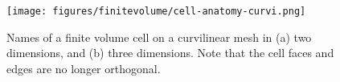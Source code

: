 \begin{figure}[ht]
    \centering
    \texttt{[image: figures/finitevolume/cell-anatomy-curvi.png]}
    \caption{Names of a finite volume cell on a curvilinear mesh in (a) two dimensions, and (b) three dimensions. Note that the cell faces and edges are no longer orthogonal.}
    \label{fig:finitevolume-cell-anatomy-curvi}
\end{figure}
